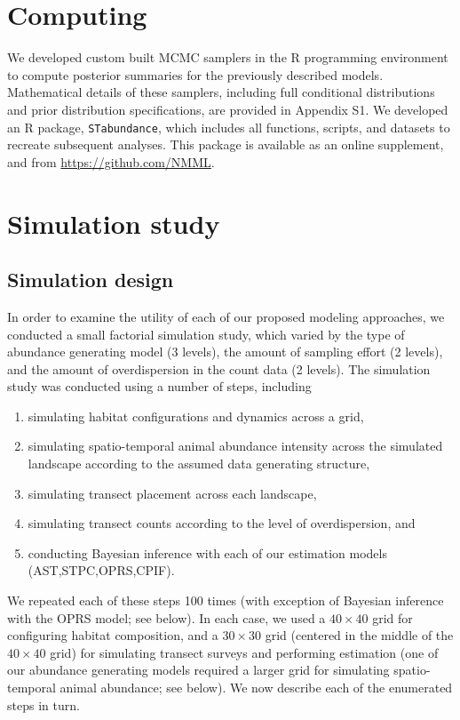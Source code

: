 \documentclass[times,mee,doublespace,]{besauth2}
\begin{document}
\section{Computing}

We developed custom built MCMC samplers in the R programming environment \citep{RTeam2012} to compute posterior summaries for the previously described models.  Mathematical details of these samplers, including full conditional distributions and prior distribution specifications, are provided in Appendix S1.  We developed an R package, \texttt{STabundance}, which includes all functions, scripts, and datasets to recreate subsequent analyses.  This package is available as an online supplement, and from \url{https://github.com/NMML}.

\section{Simulation study}

\subsection{Simulation design}

In order to examine the utility of each of our proposed modeling approaches, we conducted a small factorial simulation study, which varied by the type of abundance generating model (3 levels), the amount of sampling effort (2 levels), and the amount of overdispersion in the count data (2 levels).  The simulation study was conducted using a number of steps, including
\begin{enumerate}
 \item simulating habitat configurations and dynamics across a grid,
 \item simulating spatio-temporal animal abundance intensity across the simulated landscape according to the assumed data generating structure,
 \item simulating transect placement across each landscape,
 \item simulating transect counts according to the level of overdispersion, and
 \item conducting Bayesian inference with each of our estimation models (AST,STPC,OPRS,CPIF).
\end{enumerate}
We repeated each of these steps 100 times (with exception of Bayesian inference with the OPRS model; see below).  In each case, we used a $40 \times 40$ grid for configuring habitat composition, and
a $30 \times 30$ grid (centered in the middle of the $40 \times 40$ grid) for simulating transect surveys and performing estimation (one of our abundance generating models required a larger grid for simulating spatio-temporal animal abundance; see below).  We now describe each of the enumerated steps in turn.
\end{document}
